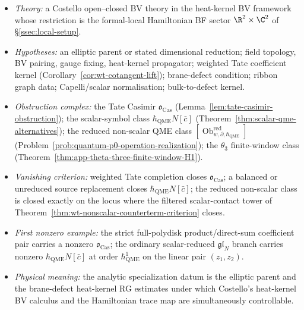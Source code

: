 \documentclass[11pt]{memoir}
\begin{document}
\begin{prob}\label{prob:analytic-graph-realization}
  \begin{itemize}
    \item \emph{Theory:} a Costello open--closed BV theory
      in the heat-kernel BV framework whose restriction is
      the formal-local Hamiltonian BF
      sector \(\R^2\times\C^2\) of \S\ref{ssec:local-setup}.
    \item \emph{Hypotheses:} an elliptic parent or stated
      dimensional reduction; field topology, BV pairing, gauge
      fixing, heat-kernel propagator; weighted Tate coefficient
      kernel
      (Corollary~\ref{cor:wt-cotangent-lift}); brane-defect condition;
      ribbon graph data; Capelli/scalar normalisation; bulk-to-defect
      kernel.
    \item \emph{Obstruction complex:} the Tate Casimir
      \(\mathfrak o_{\mathrm{Cas}}\)
      (Lemma~\ref{lem:tate-casimir-obstruction}); the scalar-symbol
      class \(\hbar_{\mathrm{QME}}N[\bar c]\)
      (Theorem~\ref{thm:scalar-qme-alternatives}); the reduced
      non-scalar QME class
      \([\operatorname{Ob}^{\mathrm{red}}_{w,\partial,\hbar_{\mathrm{QME}}}]\)
      (Problem~\ref{prob:quantum-p0-operation-realization}); the
      \(\theta_3\) finite-window class
      (Theorem~\ref{thm:app-theta-three-finite-window-H1}).
    \item \emph{Vanishing criterion:} weighted Tate completion closes
      \(\mathfrak o_{\mathrm{Cas}}\); a balanced or unreduced source
      replacement closes \(\hbar_{\mathrm{QME}}N[\bar c]\); the reduced
      non-scalar class is closed exactly on the locus where the
      filtered scalar-contact tower of
      Theorem~\ref{thm:wt-nonscalar-counterterm-criterion} closes.
    \item \emph{First nonzero example:} the strict full-polydisk
      product/direct-sum coefficient pair carries a nonzero
      \(\mathfrak o_{\mathrm{Cas}}\); the ordinary scalar-reduced
      \(\mathfrak{gl}_N\) branch carries nonzero
      \(\hbar_{\mathrm{QME}}N[\bar c]\) at order
      \(\hbar_{\mathrm{QME}}^1\) on the linear pair
      \((z_1,z_2)\).
    \item \emph{Physical meaning:} the analytic specialization datum
      is the elliptic parent and the brane-defect heat-kernel RG estimates
      under which Costello's heat-kernel BV calculus and the
      Hamiltonian trace map are simultaneously controllable.
  \end{itemize}


\end{prob}
\end{document}
